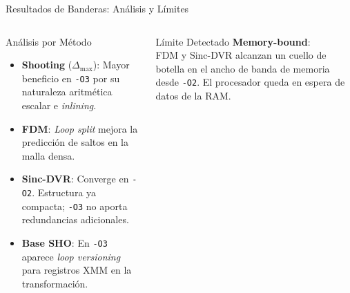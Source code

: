 \documentclass[aspectratio=169,10pt]{beamer}
\begin{document}
\begin{frame}{Resultados de Banderas: Análisis y Límites}

\begin{columns}[T]

\begin{block}{Análisis por Método}
\small
\begin{itemize}\setlength\itemsep{4pt}
  \item \textbf{Shooting} ($\Delta_{\max}$): Mayor beneficio en \texttt{-O3} por su naturaleza aritmética escalar e \emph{inlining}.
  \item \textbf{FDM}: \emph{Loop split} mejora la predicción de saltos en la malla densa.
  \item \textbf{Sinc-DVR}: Converge en \texttt{-O2}. Estructura ya compacta; \texttt{-O3} no aporta redundancias adicionales.
  \item \textbf{Base SHO}: En \texttt{-O3} aparece \emph{loop versioning} para registros XMM en la transformación.
\end{itemize}
\end{block}

\vspace{1.0cm}
\begin{alertbox}{Límite Detectado}
\textbf{Memory-bound}:\\
\vspace{0.2cm}
\footnotesize
FDM y Sinc-DVR alcanzan un cuello de botella en el ancho de banda de memoria desde \texttt{-O2}. El procesador queda en espera de datos de la RAM.
\end{alertbox}

\end{columns}
\end{frame}
\end{document}
